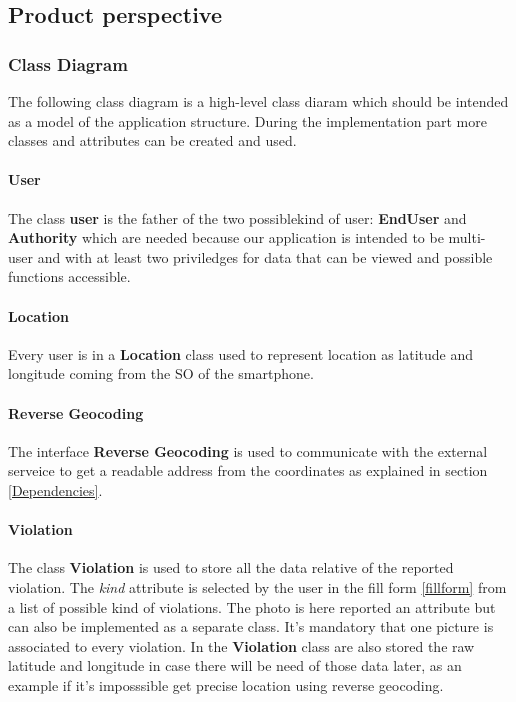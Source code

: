 



\subsection{Product perspective }

\subsubsection{Class Diagram}
The following class diagram is a high-level class diaram which should be intended as a model of the application structure. During the implementation part more classes and attributes can be created and used.

\paragraph{User}

The class \textbf{user} is the father of the two possiblekind of user: \textbf{EndUser} and \textbf{Authority} which are needed because our application is intended to be multi- user and with at least two priviledges for data that can be viewed and possible functions accessible.

\paragraph{Location}
Every user is in a \textbf{Location} class used to represent location as latitude and longitude coming from the SO of the smartphone.

\paragraph{Reverse Geocoding}
The interface \textbf{Reverse Geocoding} is used to communicate with the external serveice to get a readable address from the coordinates as explained in section \ref{Dependencies}.

\paragraph{Violation}
The class \textbf{Violation} is used to store all the data relative of the reported violation. The \textit{kind} attribute is selected by the user in the fill form \ref{fillform} from a list of possible kind of violations.
The photo is here reported an attribute but can also be implemented as a separate class. It's mandatory that one picture is associated to every violation. In the \textbf{Violation} class are also stored the raw latitude and longitude in case there will be need of those data later, as an example if it's imposssible get precise location using reverse geocoding.

